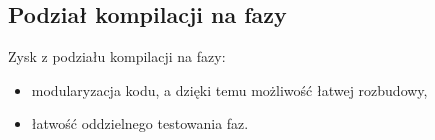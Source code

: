 \documentclass{documentation}
\begin{document}
\subsection{Podział kompilacji na fazy}
\noindent Zysk z podziału kompilacji na fazy:
\begin{itemize}
    \item modularyzacja kodu, a dzięki temu możliwość łatwej rozbudowy,
    \item łatwość oddzielnego testowania faz.
\end{itemize}
\end{document}
